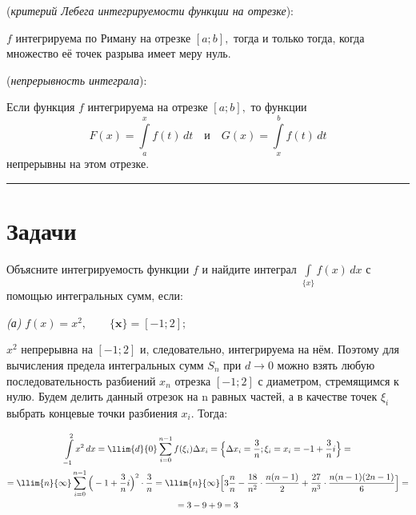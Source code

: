 \documentclass[10pt]{article}
\begin{document}
\begin{theorem} (\emph{критерий Лебега интегрируемости функции на отрезке}):

$f$ интегрируема по Риману на отрезке $[a; b],$ тогда и только тогда, когда множество её точек разрыва имеет меру нуль.

\end{theorem}

\begin{proposition} (\emph{непрерывность интеграла}):


Если функция $f$ интегрируема на отрезке $[a; b],$ то функции
$$
F(x) = \int\limits_a^x f(t) \, dt \quad \text{и} \quad G(x) = \int\limits_x^b f(t) \, dt
$$
непрерывны на этом отрезке.
\end{proposition}
\hrule

\section[Задачи]{Задачи}\label{sec:problems_30}

\vspace{2ex}

\task {}

Объясните интегрируемость функции $f$ и найдите интеграл $\displaystyle \int\limits_{\{x\}} f(x) \, dx$ с помощью интегральных сумм, если:
\vspace{3ex}

\newline\emph{(а)} \cw $f(x) = x^2, \qquad \textbf{\{x\}} = [-1; 2]; \;\;$

\begin{solution}

$x^2$ непрерывна на $[-1;2]$ и, следовательно, интегрируема на нём. Поэтому для вычисления предела интегральных сумм $S_n$ при  $d \rightarrow 0$ можно взять любую последовательность разбиений ${x_n}$ отрезка $[-1;2]$ с диаметром, стремящимся к нулю. Будем делить данный отрезок на n равных частей, а в качестве точек $\xi_i$ выбрать концевые точки разбиения $x_i$. Тогда:\newline

\begin{multline*}
\int\limits_{-1}^2 x^2\,dx=\llim{d}{0} \sum_{i=0}^{n-1} f(\xi_i)\Delta x_i=\Big\{\Delta x_i=\frac{3}{n}; \xi_i=x_i=-1+\frac{3}{n}i \Big\} = \\ = \llim{n}{\infty} \sum_{i=0}^{n-1} \Big(-1+\frac{3}{n}i \Big)^2\cdot\frac{3}{n}=\llim{n}{\infty}\Big[3\frac{n}{n}-\frac{18}{n^2}\cdot\frac{n(n-1)}{2}+\frac{27}{n^3}\cdot\frac{n(n-1)(2n-1)}{6} \Big]= \\ =3-9+9=3
\end{multline*}

\end{solution}
\end{document}
